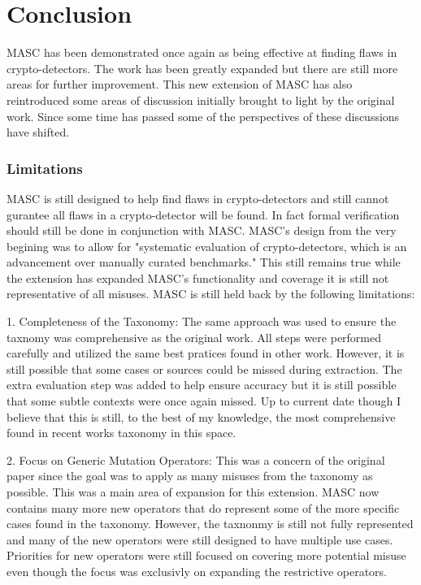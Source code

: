 \chapter{Conclusion}
\label{chap_conclusion}

MASC has been demonstrated once again as being effective at finding flaws in crypto-detectors. The work has been greatly expanded but there are still more areas for further improvement. This new extension of MASC has also reintroduced some areas of discussion initially brought to light by the original work. Since some time has passed some of the perspectives of these discussions have shifted.

\subsection{Limitations}
\label{ch6:sec:limitations}

MASC is still designed to help find flaws in crypto-detectors and still cannot gurantee all flaws in a crypto-detector will be found. In fact formal verification should still be done in conjunction with MASC. MASC's design from the very begining was to allow for "systematic evaluation of crypto-detectors, which is an advancement over manually curated benchmarks." This still remains true while the extension has expanded MASC's functionality and coverage it is still not representative of all misuses. MASC is still held back by the following limitations:

1. Completeness of the Taxonomy: The same approach was used to ensure the taxnomy was comprehensive as the original work. All steps were performed carefully and utilized the same best pratices found in other work. However, it is still possible that some cases or sources could be missed during extraction. The extra evaluation step was added to help ensure accuracy but it is still possible that some subtle contexts were once again missed. Up to current date though I believe that this is still, to the best of my knowledge, the most comprehensive found in recent works taxonomy in this space.

2. Focus on Generic Mutation Operators: This was a concern of the original paper since the goal was to apply as many misuses from the taxonomy as possible. This was a main area of expansion for this extension. MASC now contains many more new operators that do represent some of the more specific cases found in the taxonomy. However, the taxnonmy is still not fully represented and many of the new operators were still designed to have multiple use cases. Priorities for new operators were still focused on covering more potential misuse even though the focus was exclusivly on expanding the restrictive operators.


